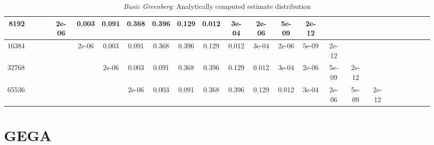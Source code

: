 \begin{appendices}
\begin{sidewaystable}
{\begin{tabular}{r|ccccccccccccccccccccccc}
8192 &&&&2e-06 &0.003 &0.091 &0.368 &0.396 &0.129 &0.012 &3e-04 &2e-06 &5e-09 &2e-12 &&&\\\hline

16384 &&&&&2e-06 &0.003 &0.091 &0.368 &0.396 &0.129 &0.012 &3e-04 &2e-06 &5e-09 &2e-12 &&\\\hline

32768 &&&&&&2e-06 &0.003 &0.091 &0.368 &0.396 &0.129 &0.012 &3e-04 &2e-06 &5e-09 &2e-12 &\\\hline

65536 &&&&&&&2e-06 &0.003 &0.091 &0.368 &0.396 &0.129 &0.012 &3e-04 &2e-06 &5e-09 &2e-12\\

\bottomrule
\end{tabular}
}
\caption{\emph{Basic Greenberg}: Analytically computed estimate distribution}
\label{basic-greenberg-stop-probabilities}

\end{sidewaystable}


\clearpage
\section{GEGA}


\end{appendices}
